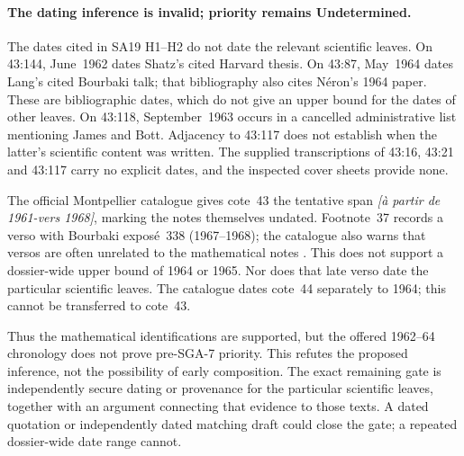 \paragraph{The dating inference is invalid; priority remains Undetermined.}
The dates cited in SA19 H1--H2 do not date the relevant scientific
leaves. On 43:144, June~1962 dates Shatz's cited Harvard thesis.
On 43:87, May~1964 dates Lang's cited Bourbaki talk; that bibliography
also cites N\'eron's 1964 paper. These are bibliographic dates,
which do not give an upper bound for the dates of other leaves.
On 43:118, September~1963 occurs in a cancelled administrative list
mentioning James and Bott. Adjacency to 43:117 does not establish
when the latter's scientific content was written. The supplied
transcriptions of 43:16, 43:21 and 43:117 carry no explicit dates,
and the inspected cover sheets provide none.

The official Montpellier catalogue gives cote~43 the tentative span
\emph{[à partir de 1961-vers 1968]}, marking the notes themselves
undated. Footnote~37 records a verso with Bourbaki exposé~338
(1967--1968); the catalogue also warns that versos are often
unrelated to the mathematical notes \cite{MontpellierCatalogue}.
This does not support a dossier-wide upper bound of 1964 or 1965.
Nor does that late verso date the particular scientific leaves.
The catalogue dates cote~44 separately to 1964; this cannot be
transferred to cote~43.

Thus the mathematical identifications are supported, but the offered
1962--64 chronology does not prove pre-SGA-7 priority. This refutes
the proposed inference, not the possibility of early composition.
The exact remaining gate is independently secure dating or provenance
for the particular scientific leaves, together with an argument
connecting that evidence to those texts. A dated quotation or
independently dated matching draft could close the gate; a repeated
dossier-wide date range cannot.

